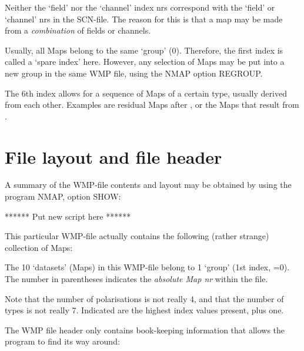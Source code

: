 	Neither the `field' nor the `channel' index nrs correspond with the
`field' or `channel' nrs in the SCN-file.  The reason for this is that a map
may be made from a {\em combination} of fields or channels. 

	Usually, all Maps belong to the same `group' (0).  Therefore, the first
index is called a `spare index' here.  However, any selection of Maps may be
put into a new group in the same WMP file, using the NMAP option REGROUP. 

	The 6th index allows for a sequence of Maps of a certain type, usually
derived from each other.  Examples are residual Maps after 
, or the Maps that result from 
. 


\section{File layout and file header} 
\label{.file.layout} 

	A summary of the WMP-file contents and layout may be obtained by using
the program NMAP, option SHOW: 


****** Put new script here ****** 


This particular WMP-file actually contains the following (rather strange)
collection of Maps: 


The 10 `datasets' (Maps) in this WMP-file belong to 1 `group' (1st index, =0). 
The number in parentheses indicates the {\em absolute Map nr} within the file. 

Note that the number of polarisations is not really 4, and that the number of
types is not really 7.  Indicated are the highest index values present, plus
one. 

The WMP file header only contains book-keeping information that allows the
program to find its way around: 


